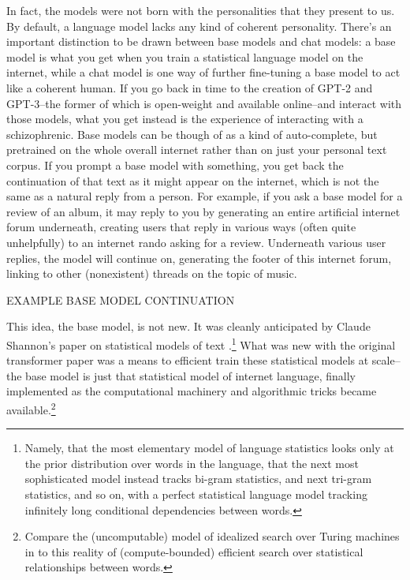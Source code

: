 In fact, the models were not born with the personalities that they present to
us. By default, a language model lacks any kind of coherent personality.
There's an important distinction to be drawn between base models and chat
models: a base model is what you get when you train a statistical language
model on the internet, while a chat model is one way of further fine-tuning a
base model to act like a coherent human. If you go back in time to the creation
of GPT-2 and GPT-3--the former of which is open-weight and available
online--and interact with those models, what you get instead is the experience
of interacting with a schizophrenic. Base models can be though of as a kind of
auto-complete, but pretrained on the whole overall internet rather than on just
your personal text corpus. If you prompt a base model with something, you get
back the continuation of that text as it might appear on the internet, which is
not the same as a natural reply from a person. For example, if you ask a base
model for a review of an album, it may reply to you by generating an entire
artificial internet forum underneath, creating users that reply in various ways
(often quite unhelpfully) to an internet rando asking for a review. Underneath
various user replies, the model will continue on, generating the footer of this
internet forum, linking to other (nonexistent) threads on the topic of music.

EXAMPLE BASE MODEL CONTINUATION

This idea, the base model, is not new. It was cleanly anticipated by Claude
Shannon's paper on statistical models of text
\cite{shannon1951english}.\footnote{Namely, that the most elementary model of
language statistics looks only at the prior distribution over words in the
language, that the next most sophisticated model instead tracks bi-gram
statistics, and next tri-gram statistics, and so on, with a perfect statistical
language model tracking infinitely long conditional dependencies between
words.} What was new with the original transformer paper was a means to
efficient train these statistical models at scale--the base model is just that
statistical model of internet language, finally implemented as the
computational machinery and algorithmic tricks became
available.\footnote{Compare the (uncomputable) model of idealized search over
Turing machines in \cite{hutter2000aixi} to this reality of (compute-bounded)
efficient search over statistical relationships between words.}

